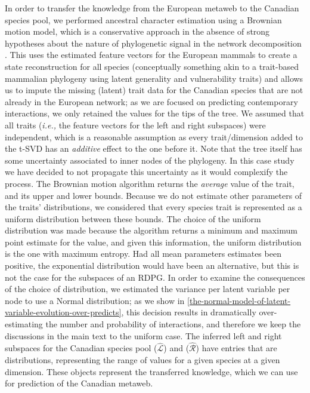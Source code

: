 In order to transfer the knowledge from the European metaweb to the
Canadian species pool, we performed ancestral character estimation using
a Brownian motion model, which is a conservative approach in the absence
of strong hypotheses about the nature of phylogenetic signal in the
network decomposition \cite{Litsios2012EffPhy}. This uses the estimated
feature vectors for the European mammals to create a state
reconstruction for all species (conceptually something akin to a
trait-based mammalian phylogeny using latent generality and
vulnerability traits) and allows us to impute the missing (latent) trait
data for the Canadian species that are not already in the European
network; as we are focused on predicting contemporary interactions, we
only retained the values for the tips of the tree. We assumed that all
traits (\emph{i.e.,} the feature vectors for the left and right
subspaces) were independent, which is a reasonable assumption as every
trait/dimension added to the t-SVD has an \emph{additive} effect to the
one before it. Note that the \cite{Upham2019InfMam} tree itself has some
uncertainty associated to inner nodes of the phylogeny. In this case
study we have decided to not propagate this uncertainty as it would
complexify the process. The Brownian motion algorithm returns the
\emph{average} value of the trait, and its upper and lower bounds.
Because we do not estimate other parameters of the traits'
distributions, we considered that every species trait is represented as
a uniform distribution between these bounds. The choice of the uniform
distribution was made because the algorithm returns a minimum and
maximum point estimate for the value, and given this information, the
uniform distribution is the one with maximum entropy. Had all mean
parameters estimates been positive, the exponential distribution would
have been an alternative, but this is not the case for the subspaces of
an RDPG. In order to examine the consequences of the choice of
distribution, we estimated the variance per latent variable per node to
use a Normal distribution; as we show in \autoref{the-normal-model-of-latent-variable-evolution-over-predicts}, this decision
results in dramatically over-estimating the number and probability of
interactions, and therefore we keep the discussions in the main text to
the uniform case. The inferred left and right subspaces for the Canadian
species pool ($\hat{\mathscr{L}}$) and ($\hat{\mathscr{R}}$) have
entries that are distributions, representing the range of values for a
given species at a given dimension. These objects represent the
transferred knowledge, which we can use for prediction of the Canadian
metaweb.

